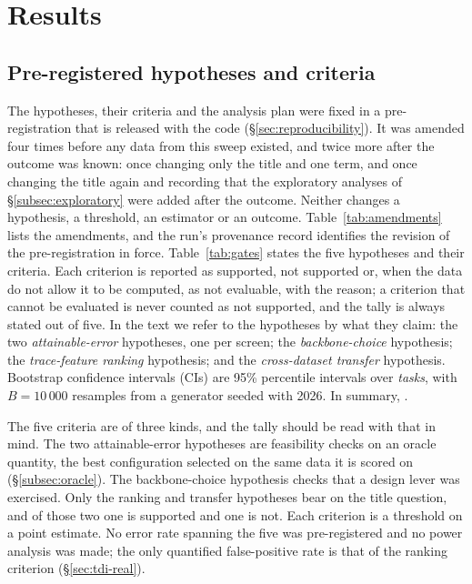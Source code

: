 
\section{Results}\label{sec:results}

\subsection{Pre-registered hypotheses and criteria}\label{subsec:prereg}

The hypotheses, their criteria and the analysis plan were fixed in a pre-registration that is
released with the code (\S\ref{sec:reproducibility}). It was amended four times before any data
from this sweep existed, and twice more after the outcome was known: once changing only the
title and one term, and once changing the title again and recording that the exploratory
analyses of \S\ref{subsec:exploratory} were added after the outcome. Neither changes a
hypothesis, a threshold, an estimator or an outcome. Table~\ref{tab:amendments} lists the amendments, and the run's provenance record
identifies the revision of the pre-registration in force. Table~\ref{tab:gates} states the five
hypotheses and their criteria. Each criterion is reported as supported, not supported or, when the
data do not allow it to be computed, as not evaluable, with the reason; a criterion that cannot
be evaluated is never counted as not supported, and the tally is always
stated out of five. In the text we refer to the hypotheses by what they claim: the two
\emph{attainable-error} hypotheses, one per screen; the \emph{backbone-choice} hypothesis; the
\emph{trace-feature ranking} hypothesis; and the \emph{cross-dataset transfer} hypothesis.
Bootstrap confidence intervals (CIs) are 95\% percentile intervals over \emph{tasks}, with $B=10\,000$
resamples from a generator seeded with 2026. In summary, \resGateSummary.

The five criteria are of three kinds, and the tally should be read with that in mind. The two
attainable-error hypotheses are feasibility checks on an oracle quantity, the best
configuration selected on the same data it is scored on (\S\ref{subsec:oracle}). The backbone-choice hypothesis checks that a design lever was exercised. Only the
ranking and transfer hypotheses bear on the title question, and of those two one is supported
and one is not. Each criterion is a threshold on a point estimate. No error rate spanning the
five was pre-registered and no power analysis was made; the only quantified false-positive rate
is that of the ranking criterion (\S\ref{sec:tdi-real}).

